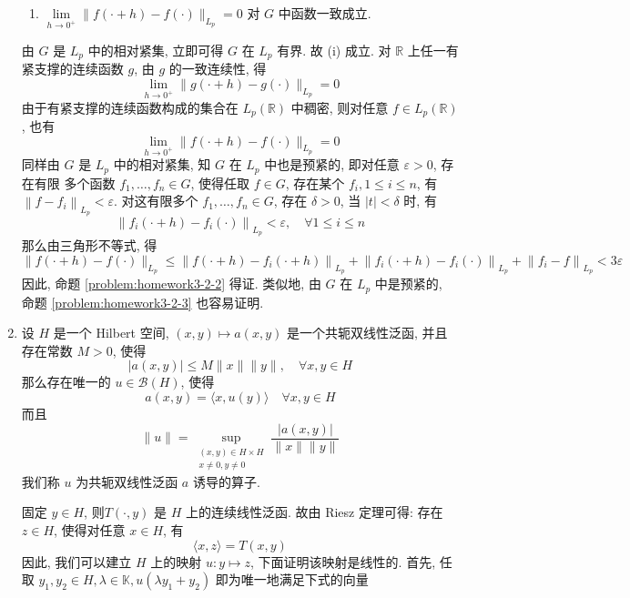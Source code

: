 \begin{enumerate}
\begin{enumerate}
            \item\label{problem:homework3-2-3} $\lim \limits_{h \rightarrow 0^{+}}\|f(\cdot+h)-f(\cdot)\|_{L_{p}}=0$ 对 $G$ 中函数一致成立.
        \end{enumerate}
    \begin{answer}
        由 $G$ 是 $L_{p}$ 中的相对紧集, 立即可得 $G$ 在 $L_{p}$ 有界. 故 (i) 成立. 对 $\mathbb{R}$ 上任一有紧支撑的连续函数 $g$, 由 $g$ 的一致连续性, 得
        \[
        \lim _{h \rightarrow 0^{+}}\|g(\cdot+h)-g(\cdot)\|_{L_{p}}=0
        \]
        由于有紧支撑的连续函数构成的集合在 $L_{p}(\mathbb{R})$ 中稠密, 则对任意 $f \in L_{p}(\mathbb{R})$, 也有
        \[
        \lim _{h \rightarrow 0^{+}}\|f(\cdot+h)-f(\cdot)\|_{L_{p}}=0
        \]
        同样由 $G$ 是 $L_{p}$ 中的相对紧集, 知 $G$ 在 $L_{p}$ 中也是预紧的, 即对任意 $\varepsilon>0$, 存在有限 多个函数 $f_{1}, \ldots, f_{n} \in G$, 使得任取 $f \in G$, 存在某个 $f_{i}, 1 \leq i \leq n$, 有 $\left\|f-f_{i}\right\|_{L_{p}}<\varepsilon$. 对这有限多个 $f_{1}, \ldots, f_{n} \in G$, 存在 $\delta>0$, 当 $|t|<\delta$ 时, 有
        \[
        \left\|f_{i}(\cdot+h)-f_{i}(\cdot)\right\|_{L_{p}}<\varepsilon, \quad \forall 1 \leq i \leq n
        \]
        那么由三角形不等式, 得
        \[
        \|f(\cdot+h)-f(\cdot)\|_{L_{p}} \leq\left\|f(\cdot+h)-f_{i}(\cdot+h)\right\|_{L_{p}}+\left\|f_{i}(\cdot+h)-f_{i}(\cdot)\right\|_{L_{p}}+\left\|f_{i}-f\right\|_{L_{p}}<3 \varepsilon
        \]
        因此, 命题 \ref{problem:homework3-2-2} 得证. 类似地, 由 $G$ 在 $L_{p}$ 中是预紧的, 命题 \ref{problem:homework3-2-3} 也容易证明.
    \end{answer}
    \item 设 $H$ 是一个 Hilbert 空间, $(x, y) \mapsto a(x, y)$ 是一个共轭双线性泛函, 并且存在常数 $M>0$, 使得
    \[
    |a(x, y)| \leq M\|x\|\|y\|, \quad \forall x, y \in H
    \]
    那么存在唯一的 $u \in \mathcal{B}(H)$, 使得
    \[
    a(x, y)=\langle x, u(y)\rangle \quad \forall x, y \in H
    \]
    而且
    \[
    \|u\|=\sup _{\substack{(x, y) \in H \times H \\ x \neq  0, y \neq  0}} \frac{|a(x, y)|}{\|x\|\|y\|}
    \]
    我们称 $u$ 为共轭双线性泛函 $a$ 诱导的算子.
    \begin{answer}
        固定 $y \in H$, 则$T(\cdot, y)$ 是 $H$ 上的连续线性泛函. 故由 Riesz 定理可得: 存在 $z \in H$, 使得对任意 $x \in H$, 有
        \[
        \langle x, z\rangle=T(x, y)
        \]因此, 我们可以建立 $H$ 上的映射 $u: y \mapsto z$, 下面证明该映射是线性的. 首先, 任取 $y_{1}, y_{2} \in H, \lambda \in \mathbb{K}, u\left(\lambda y_{1}+y_{2}\right)$ 即为唯一地满足下式的向量

\end{answer}
\end{enumerate}
